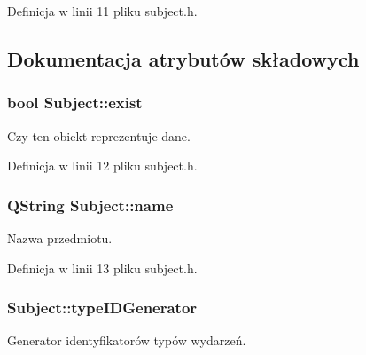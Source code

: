 Definicja w linii 11 pliku subject.h.



\subsection{Dokumentacja atrybutów składowych}
\hypertarget{classSubject_a94220ae4e81cef6a54b3ad00c5189213}{
\subsubsection[{exist}]{\setlength{\rightskip}{0pt plus 5cm}bool {\bf Subject::exist}}}
\label{classSubject_a94220ae4e81cef6a54b3ad00c5189213}


Czy ten obiekt reprezentuje dane. 



Definicja w linii 12 pliku subject.h.

\hypertarget{classSubject_a816225e2744f102877f713f3123a6ba4}{
\subsubsection[{name}]{\setlength{\rightskip}{0pt plus 5cm}QString {\bf Subject::name}}}
\label{classSubject_a816225e2744f102877f713f3123a6ba4}


Nazwa przedmiotu. 



Definicja w linii 13 pliku subject.h.

\hypertarget{classSubject_aab207d1dd2076df8de622c54d80fd8cd}{
\subsubsection[{typeIDGenerator}]{ {\bf Subject::typeIDGenerator}}}
\label{classSubject_aab207d1dd2076df8de622c54d80fd8cd}


Generator identyfikatorów typów wydarzeń. 



